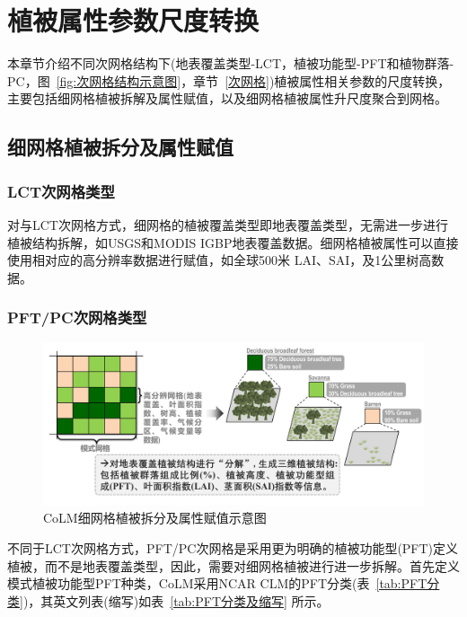 \chapter{植被属性参数尺度转换}\label{植被尺度转换}

本章节介绍不同次网格结构下(地表覆盖类型-LCT，植被功能型-PFT和植物群落-PC，图~\ref{fig:次网格结构示意图}，章节~\ref{次网格})植被属性相关参数的尺度转换，主要包括细网格植被拆解及属性赋值，以及细网格植被属性升尺度聚合到网格。

\section{细网格植被拆分及属性赋值}
\subsection{LCT次网格类型}

对与LCT次网格方式，细网格的植被覆盖类型即地表覆盖类型，无需进一步进行植被结构拆解，如USGS和MODIS IGBP地表覆盖数据。细网格植被属性可以直接使用相对应的高分辨率数据进行赋值，如全球500米 LAI、SAI，及1公里树高数据。

\subsection{PFT/PC次网格类型}

{
\begin{figure}[htbp]
\centering
\includegraphics[width=1\textwidth]{Figures/尺度转换/细网格植被覆盖类型及占比拆分示意图.png}
\caption{CoLM细网格植被拆分及属性赋值示意图}
\label{fig:细网格拆分示意图}
\end{figure}
}

不同于LCT次网格方式，PFT/PC次网格是采用更为明确的植被功能型(PFT)定义植被，而不是地表覆盖类型，因此，需要对细网格植被进行进一步拆解。首先定义模式植被功能型PFT种类，CoLM采用NCAR CLM的PFT分类(表~\ref{tab:PFT分类})，其英文列表(缩写)如表~\ref{tab:PFT分类及缩写} 所示。

